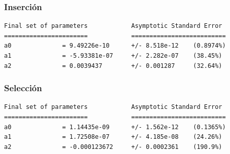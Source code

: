 \documentclass[a4]{article}
\begin{document}
\begin{figure}[H] \centering
{}
\end{figure}

\vspace{-10mm}

\subsubsection{Inserción}

\begin{verbatim}
Final set of parameters            Asymptotic Standard Error
=======================            ==========================
a0              = 9.49226e-10      +/- 8.518e-12    (0.8974%)
a1              = -5.93381e-07     +/- 2.282e-07    (38.45%)
a2              = 0.0039437        +/- 0.001287     (32.64%)
\end{verbatim}

\begin{figure}[H] \centering
{}
\end{figure}

\subsubsection{Selección}
\begin{verbatim}
Final set of parameters            Asymptotic Standard Error
=======================            ==========================
a0              = 1.14435e-09      +/- 1.562e-12    (0.1365%)
a1              = 1.72508e-07      +/- 4.185e-08    (24.26%)
a2              = -0.000123672     +/- 0.0002361    (190.9%)
\end{verbatim}
\end{document}
